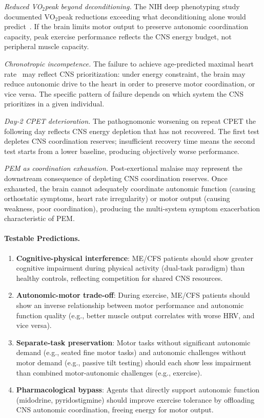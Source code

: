 \begin{hypothesis}
\textit{Reduced VO$_2$peak beyond deconditioning.} The NIH deep phenotyping study documented VO$_2$peak reductions exceeding what deconditioning alone would predict~\cite{walitt2024deep}. If the brain limits motor output to preserve autonomic coordination capacity, peak exercise performance reflects the CNS energy budget, not peripheral muscle capacity.

\textit{Chronotropic incompetence.} The failure to achieve age-predicted maximal heart rate~\cite{walitt2024deep} may reflect CNS prioritization: under energy constraint, the brain may reduce autonomic drive to the heart in order to preserve motor coordination, or vice versa. The specific pattern of failure depends on which system the CNS prioritizes in a given individual.

\textit{Day-2 CPET deterioration.} The pathognomonic worsening on repeat CPET the following day reflects CNS energy depletion that has not recovered. The first test depletes CNS coordination reserves; insufficient recovery time means the second test starts from a lower baseline, producing objectively worse performance.

\textit{PEM as coordination exhaustion.} Post-exertional malaise may represent the downstream consequence of depleting CNS coordination reserves. Once exhausted, the brain cannot adequately coordinate autonomic function (causing orthostatic symptoms, heart rate irregularity) or motor output (causing weakness, poor coordination), producing the multi-system symptom exacerbation characteristic of PEM.

\paragraph{Testable Predictions.}
\begin{enumerate}
    \item \textbf{Cognitive-physical interference}: ME/CFS patients should show greater cognitive impairment during physical activity (dual-task paradigm) than healthy controls, reflecting competition for shared CNS resources.
    \item \textbf{Autonomic-motor trade-off}: During exercise, ME/CFS patients should show an inverse relationship between motor performance and autonomic function quality (e.g., better muscle output correlates with worse HRV, and vice versa).
    \item \textbf{Separate-task preservation}: Motor tasks without significant autonomic demand (e.g., seated fine motor tasks) and autonomic challenges without motor demand (e.g., passive tilt testing) should each show less impairment than combined motor-autonomic challenges (e.g., exercise).
    \item \textbf{Pharmacological bypass}: Agents that directly support autonomic function (midodrine, pyridostigmine) should improve exercise tolerance by offloading CNS autonomic coordination, freeing energy for motor output.
\end{enumerate}


\end{hypothesis}
